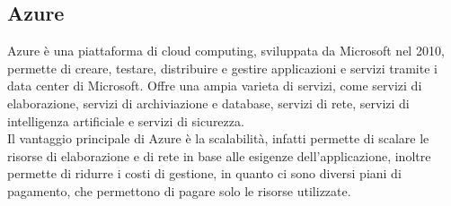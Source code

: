 \subsection{Azure}
Azure è una piattaforma di cloud computing, sviluppata da Microsoft nel 2010, permette di creare, testare, distribuire e gestire applicazioni e servizi tramite i data center di Microsoft.
Offre una ampia varieta di servizi, come servizi di elaborazione, servizi di archiviazione e database, servizi di rete, servizi di intelligenza artificiale e servizi di sicurezza.\\
Il vantaggio principale di Azure è la scalabilità, infatti permette di scalare le risorse di elaborazione e di rete in base alle esigenze dell'applicazione, inoltre permette di ridurre i costi di gestione, in quanto
ci sono diversi piani di pagamento, che permettono di pagare solo le risorse utilizzate.\\
